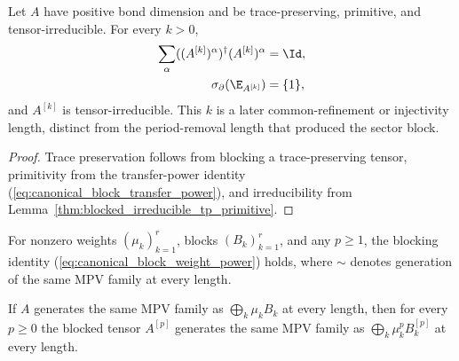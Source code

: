 \begin{lemma}%
    \label{thm:tp_primitive_irreducible_extra_blocking}
    \leanok
    Let $A$ have positive bond dimension and be trace-preserving, primitive,
    and tensor-irreducible. For every $k>0$,
    \begin{align}
        \sum_\alpha((A^{[k]})^\alpha)^\dagger(A^{[k]})^\alpha
         & =\Id,
        \notag     \\
        \sigma_\partial(\E_{A^{[k]}})
         & =\{1\},
        \label{eq:canonical_extra_blocking}
    \end{align}
    and $A^{[k]}$ is tensor-irreducible. This $k$ is a later common-refinement
    or injectivity length, distinct from the period-removal length that
    produced the sector block.
\end{lemma}

\begin{proof}\leanok
    Trace preservation follows from blocking a trace-preserving tensor,
    primitivity from the transfer-power identity
    (\ref{eq:canonical_block_transfer_power}), and irreducibility from
    Lemma~\ref{thm:blocked_irreducible_tp_primitive}.
\end{proof}

\begin{lemma}%
    \label{thm:block_tensor_to_tensor_from_blocks}
    \leanok
    For nonzero weights $(\mu_k)_{k=1}^r$, blocks $(B_k)_{k=1}^r$, and any
    $p\ge1$, the blocking identity
    (\ref{eq:canonical_block_weight_power}) holds, where $\sim$ denotes
    generation of the same MPV family at every length.
\end{lemma}

\begin{lemma}%
    \label{thm:block_tensor_of_same_mpv_to_tensor_from_blocks}
    \leanok
    If $A$ generates the same MPV family as $\bigoplus_k\mu_kB_k$ at every
    length, then for every $p\ge0$ the blocked tensor $A^{[p]}$ generates the
    same MPV family as $\bigoplus_k\mu_k^pB_k^{[p]}$ at every length.
\end{lemma}

